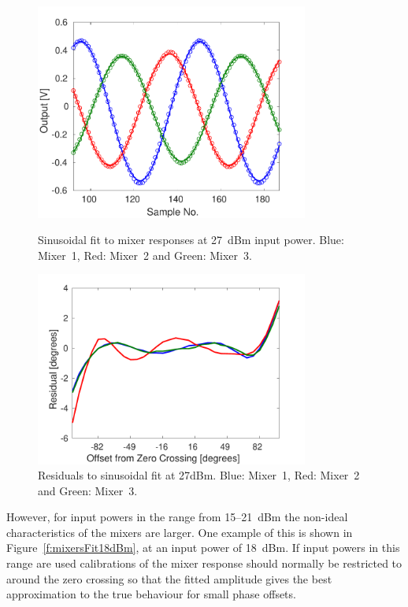 \begin{figure}
  \centering
  \includegraphics[width=0.8\textwidth]{Figures/phaseMons/mixersFit27dBm}
  \caption{Sinusoidal fit to mixer responses at 27~dBm input power. Blue: Mixer~1, Red: Mixer~2 and Green: Mixer~3.}
  \label{f:mixersFit27dBm}
  \includegraphics[width=0.8\textwidth]{Figures/phaseMons/mixersFitResid27dBm}
  \caption{Residuals to sinusoidal fit at 27dBm. Blue: Mixer~1, Red: Mixer~2 and Green: Mixer~3.}
  \label{f:mixersFitResid27dBm}
\end{figure}

However, for input powers in the range from 15--21~dBm the non-ideal characteristics of the mixers are larger. One example of this is shown in Figure~\ref{f:mixersFit18dBm}, at an input power of 18~dBm. If input powers in this range are used calibrations of the mixer response should normally be restricted to around the zero crossing so that the fitted amplitude gives the best approximation to the true behaviour for small phase offsets. 

